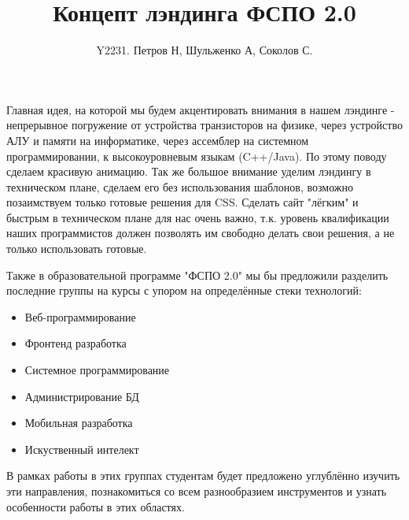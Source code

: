 \documentclass[14pt]{extarticle}
\title{Концепт лэндинга ФСПО 2.0}
\author{Y2231. Петров Н, Шульженко А, Соколов С.}
\begin{document}
  \maketitle
  \hspace{1.25em}Главная идея, на которой мы будем акцентировать внимания в нашем лэндинге - непрерывное погружение от устройства транзисторов на физике, через устройство АЛУ и памяти на информатике, через ассемблер на системном программировании, к высокоуровневым языкам (C++/Java).
  По этому поводу сделаем красивую анимацию.
  Так же большое внимание уделим лэндингу в техническом плане, сделаем его без использования шаблонов, возможно позаимствуем только готовые решения для CSS.
  Сделать сайт "лёгким" и быстрым в техническом плане для нас очень важно, т.к. уровень квалификации наших программистов должен позволять им свободно делать свои решения, а не только использовать готовые.

  \hspace{1.25em}Также в образовательной программе "ФСПО 2.0" мы бы предложили разделить последние группы на курсы с упором на определённые стеки технологий:
  \begin{itemize}
    \item Веб-программирование
    \item Фронтенд разработка
    \item Системное программирование
    \item Администрирование БД
    \item Мобильная разработка
    \item Искуственный интелект
  \end{itemize}
  В рамках работы в этих группах студентам будет предложено углублённо изучить эти направления, познакомиться со всем разнообразием инструментов и узнать особенности работы в этих областях.
\end{document}
